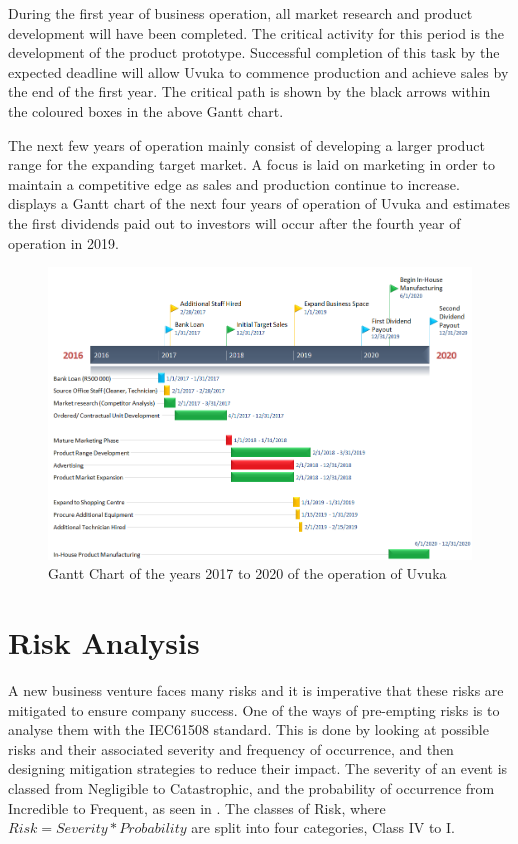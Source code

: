 During the first year of business operation, all market research and product development will have been completed. The critical activity for this period is the development of the product prototype. Successful completion of this task by the expected deadline will allow Uvuka to commence production and achieve sales by the end of the first year. The critical path is shown by the black arrows within the coloured boxes in the above Gantt chart.

The next few years of operation mainly consist of developing a larger product range for the expanding target market. A focus is laid on marketing in order to maintain a competitive edge as sales and production continue to increase.  displays a Gantt chart of the next four years of operation of Uvuka and estimates the first dividends paid out to investors will occur after the fourth year of operation in 2019.

\begin{figure}[H]
\centering
\includegraphics[width=1\textwidth]{Gantt_2.PNG}
\vskip10pt
\caption[Gantt Chart of the years 2017 to 2020 of the operation of Uvuka]{Gantt Chart of the years 2017 to 2020 of the operation of Uvuka}
\label{fig:Gantt Chart 2}
\end{figure}


\newpage 
\section{Risk Analysis}
A new business venture faces many risks and it is imperative that these risks are mitigated to ensure company success. One of the ways of pre-empting risks is to analyse them with the IEC61508 standard. This is done by looking at possible risks and their associated severity and frequency of occurrence, and then designing mitigation strategies to reduce their impact. The severity of an event is classed from Negligible to Catastrophic, and the probability of occurrence from Incredible to Frequent, as seen in . The classes of Risk, where $Risk = Severity * Probability$ are split into four categories, Class IV to I.

